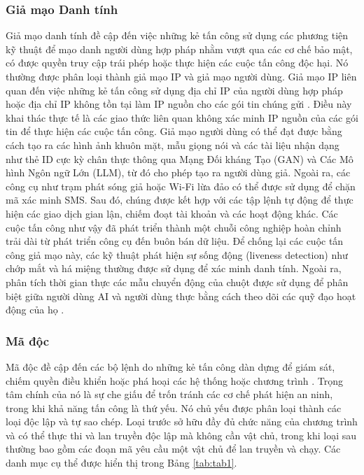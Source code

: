 \documentclass[conference]{IEEEtran}
\begin{document}
\subsubsection{Giả mạo Danh tính}
Giả mạo danh tính đề cập đến việc những kẻ tấn công sử dụng các phương tiện kỹ thuật để mạo danh người dùng hợp pháp nhằm vượt qua các cơ chế bảo mật, có được quyền truy cập trái phép hoặc thực hiện các cuộc tấn công độc hại. Nó thường được phân loại thành giả mạo IP và giả mạo người dùng. Giả mạo IP liên quan đến việc những kẻ tấn công sử dụng địa chỉ IP của người dùng hợp pháp hoặc địa chỉ IP không tồn tại làm IP nguồn cho các gói tin chúng gửi \cite{ref22}. Điều này khai thác thực tế là các giao thức liên quan không xác minh IP nguồn của các gói tin để thực hiện các cuộc tấn công. Giả mạo người dùng có thể đạt được bằng cách tạo ra các hình ảnh khuôn mặt, mẫu giọng nói và các tài liệu nhận dạng như thẻ ID cực kỳ chân thực thông qua Mạng Đối kháng Tạo (GAN) và Các Mô hình Ngôn ngữ Lớn (LLM), từ đó cho phép tạo ra người dùng giả. Ngoài ra, các công cụ như trạm phát sóng giả hoặc Wi-Fi lừa đảo có thể được sử dụng để chặn mã xác minh SMS. Sau đó, chúng được kết hợp với các tập lệnh tự động để thực hiện các giao dịch gian lận, chiếm đoạt tài khoản và các hoạt động khác. Các cuộc tấn công như vậy đã phát triển thành một chuỗi công nghiệp hoàn chỉnh trải dài từ phát triển công cụ đến buôn bán dữ liệu. Để chống lại các cuộc tấn công giả mạo này, các kỹ thuật phát hiện sự sống động (liveness detection) như chớp mắt và há miệng thường được sử dụng để xác minh danh tính. Ngoài ra, phân tích thời gian thực các mẫu chuyển động của chuột được sử dụng để phân biệt giữa người dùng AI và người dùng thực bằng cách theo dõi các quỹ đạo hoạt động của họ \cite{ref29}.

\subsubsection{Mã độc}
Mã độc đề cập đến các bộ lệnh do những kẻ tấn công dàn dựng để giám sát, chiếm quyền điều khiển hoặc phá hoại các hệ thống hoặc chương trình \cite{ref23}. Trọng tâm chính của nó là sự che giấu để trốn tránh các cơ chế phát hiện an ninh, trong khi khả năng tấn công là thứ yếu. Nó chủ yếu được phân loại thành các loại độc lập và tự sao chép. Loại trước sở hữu đầy đủ chức năng của chương trình và có thể thực thi và lan truyền độc lập mà không cần vật chủ, trong khi loại sau thường bao gồm các đoạn mã yêu cầu một vật chủ để lan truyền và chạy. Các danh mục cụ thể được hiển thị trong Bảng \ref{tab:tab1}.
\end{document}
